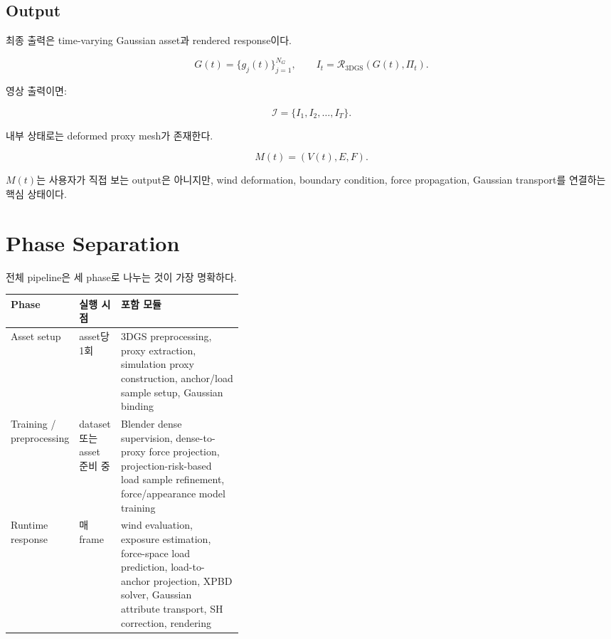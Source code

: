 \documentclass[11pt,a4paper]{article}
\begin{document}
\subsection{Output}

최종 출력은 time-varying Gaussian asset과 rendered response이다.

\begin{equation}
G(t)=\{g_j(t)\}_{j=1}^{N_G},\qquad
I_t=\mathcal{R}_{\mathrm{3DGS}}(G(t),\Pi_t).
\end{equation}

영상 출력이면:

\begin{equation}
\mathcal{I}=\{I_1,I_2,\ldots,I_T\}.
\end{equation}

내부 상태로는 deformed proxy mesh가 존재한다.

\begin{equation}
M(t)=(V(t),E,F).
\end{equation}

$M(t)$는 사용자가 직접 보는 output은 아니지만, wind deformation, boundary condition, force propagation, Gaussian transport를 연결하는 핵심 상태이다.

\section{Phase Separation}

전체 pipeline은 세 phase로 나누는 것이 가장 명확하다.

\begin{center}
\begin{tabularx}{0.96\linewidth}{L{0.2\linewidth}L{0.18\linewidth}Y}
\toprule
Phase & 실행 시점 & 포함 모듈 \\
\midrule
Asset setup & asset당 1회 & 3DGS preprocessing, proxy extraction, simulation proxy construction, anchor/load sample setup, Gaussian binding \\
Training / preprocessing & dataset 또는 asset 준비 중 & Blender dense supervision, dense-to-proxy force projection, projection-risk-based load sample refinement, force/appearance model training \\
Runtime response & 매 frame & wind evaluation, exposure estimation, force-space load prediction, load-to-anchor projection, XPBD solver, Gaussian attribute transport, SH correction, rendering \\
\bottomrule
\end{tabularx}
\end{center}
\end{document}
